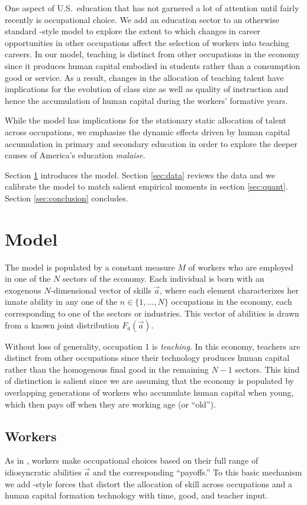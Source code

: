 \documentclass[onehalfspacing,11pt]{article}
\begin{document}
One aspect of U.S.~education that has not garnered a lot of attention until fairly recently is occupational choice. We add an education sector to an otherwise standard \cite{Hsieh:2018}-style model to explore the extent to which changes in career opportunities in other occupations affect the selection of workers into teaching careers. In our model, teaching is distinct from other occupations in the economy since it produces human capital embodied in students rather than a consumption good or service. As a result, changes in the allocation of teaching talent have implications for the evolution of class size as well as quality of instruction and hence the accumulation of human capital during the workers' formative years.

While the model has implications for the stationary static allocation of talent across occupations, we emphasize the dynamic effects driven by human capital accumulation in primary and secondary education in order to explore the deeper causes of America's education \textit{malaise}.

Section \ref{sec:model} introduces the model. Section \ref{sec:data} reviews the data and we calibrate the model to match salient empirical moments in section \ref{sec:quant}. Section \ref{sec:conclusion} concludes.

\section{Model}\label{sec:model}
The model is populated by a constant measure $M$ of workers who are employed in one of the $N$ sectors of the economy. Each individual is born with an exogenous $N$-dimensional vector of skills $\vec{a}$, where each element characterizes her innate ability in any one of the $n \in \{1,\ldots,N\}$ occupations in the economy, each corresponding to one of the sectors or industries. This vector of abilities is drawn from a known joint distribution $F_a(\vec{a})$.

Without loss of generality, occupation 1 is \textit{teaching}. In this economy, teachers are distinct from other occupations since their technology produces human capital rather than the homogenous final good in the remaining $N-1$ sectors. This kind of distinction is salient since we are assuming that the economy is populated by overlapping generations of workers who accumulate human capital when young, which then pays off when they are working age (or ``old'').
\subsection{Workers}
As in \cite{Roy:1951}, workers make occupational choices based on their full range of idiosyncratic abilities $\vec{a}$ and the corresponding ``payoffs.'' To this basic mechanism we add \cite{Hsieh:2018}-style forces that distort the allocation of skill across occupations and a human capital formation technology with time, good, and teacher input.
\end{document}
